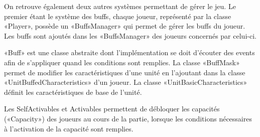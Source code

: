 
On retrouve également deux autres systèmes permettant de gérer le jeu.
Le premier étant le système des buffs, chaque joueur, représenté par la classe
«Player», possède un «BuffsManager» qui permet de gérer les buffs du joueur.
Les buffs sont ajoutés dans les «BuffsManager» des joueurs concernés par
celui-ci.

«Buff» est une classe abstraite dont l'implémentation se doit d'écouter des events
afin de s'appliquer quand les conditions sont remplies.
La classe «BuffMask» permet de modifier les caractéristiques d'une unité en
l'ajoutant dans la classe «UnitBuffedCharacteristics» d'un joueur.
La classe «UnitBasicCharacteristics» définit les caractéristiques de base de l'unité.

Les SelfActivables et Activables permettent de débloquer les capacités («Capacity») des
joueurs au cours de la partie, lorsque les conditions nécessaires à l'activation
de la capacité sont remplies.

